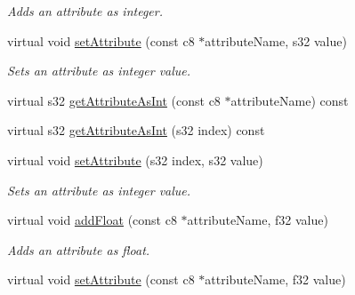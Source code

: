 \begin{DoxyCompactItemize}
\begin{DoxyCompactList}\small\item\em Adds an attribute as integer. \end{DoxyCompactList}\item 
virtual void \hyperlink{classirr_1_1io_1_1_c_attributes_aa44a7ea686530f2ec01c47b4c4cb230a}{set\-Attribute} (const c8 $\ast$attribute\-Name, s32 value)
\begin{DoxyCompactList}\small\item\em Sets an attribute as integer value. \end{DoxyCompactList}\item 
virtual s32 \hyperlink{classirr_1_1io_1_1_c_attributes_afe7925dfeed74a736eb46ddae7feb30b}{get\-Attribute\-As\-Int} (const c8 $\ast$attribute\-Name) const 
\item 
virtual s32 \hyperlink{classirr_1_1io_1_1_c_attributes_aa464893bd208c9aee9c4a7b0ff52db87}{get\-Attribute\-As\-Int} (s32 index) const 
\item 
\hypertarget{classirr_1_1io_1_1_c_attributes_a7d833ca87d8fa3a9a3997e0c4f9c7e7b}{virtual void \hyperlink{classirr_1_1io_1_1_c_attributes_a7d833ca87d8fa3a9a3997e0c4f9c7e7b}{set\-Attribute} (s32 index, s32 value)}\label{classirr_1_1io_1_1_c_attributes_a7d833ca87d8fa3a9a3997e0c4f9c7e7b}

\begin{DoxyCompactList}\small\item\em Sets an attribute as integer value. \end{DoxyCompactList}\item 
\hypertarget{classirr_1_1io_1_1_c_attributes_af0b2269019e815580d8334cdb3a93f1e}{virtual void \hyperlink{classirr_1_1io_1_1_c_attributes_af0b2269019e815580d8334cdb3a93f1e}{add\-Float} (const c8 $\ast$attribute\-Name, f32 value)}\label{classirr_1_1io_1_1_c_attributes_af0b2269019e815580d8334cdb3a93f1e}

\begin{DoxyCompactList}\small\item\em Adds an attribute as float. \end{DoxyCompactList}\item 
\hypertarget{classirr_1_1io_1_1_c_attributes_a13b8fef7a3cbb976a27339a67f9b86ee}{virtual void \hyperlink{classirr_1_1io_1_1_c_attributes_a13b8fef7a3cbb976a27339a67f9b86ee}{set\-Attribute} (const c8 $\ast$attribute\-Name, f32 value)}\label{classirr_1_1io_1_1_c_attributes_a13b8fef7a3cbb976a27339a67f9b86ee}


\end{DoxyCompactItemize}
